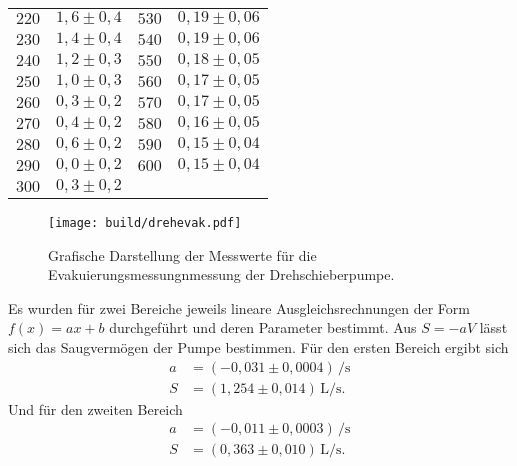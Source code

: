 \begin{table}[H]
\begin{tabular}{c c | c c}
    $220$ & $  1,6 \pm   0,4$  & $530$ & $ 0,19 \pm 0,06 $ \\
    $230$ & $  1,4 \pm   0,4$  & $540$ & $ 0,19 \pm 0,06 $ \\
    $240$ & $  1,2 \pm   0,3$  & $550$ & $ 0,18 \pm 0,05 $ \\
    $250$ & $  1,0 \pm   0,3$  & $560$ & $ 0,17 \pm 0,05 $ \\
    $260$ & $  0,3 \pm  0,2$   & $570$ & $ 0,17 \pm 0,05 $ \\
    $270$ & $  0,4 \pm  0,2$   & $580$ & $ 0,16 \pm 0,05 $ \\
    $280$ & $  0,6 \pm  0,2$   & $590$ & $ 0,15 \pm 0,04 $ \\
    $290$ & $  0,0 \pm  0,2$   & $600$ & $ 0,15 \pm 0,04 $ \\
    $300$ & $  0,3 \pm  0,2$   &       & $ $ \\
    \bottomrule
  \end{tabular}
\end{table}

\begin{figure}[H]
  \centering
  \texttt{[image: build/drehevak.pdf]}
  \caption{Grafische Darstellung der Messwerte für die Evakuierungsmessungnmessung der Drehschieberpumpe.}
  \label{fig:drehevak}
\end{figure}

Es wurden für zwei Bereiche jeweils lineare Ausgleichsrechnungen der Form $f(x)=ax+b$ durchgeführt und deren
Parameter bestimmt. Aus $S=-aV$ lässt sich das Saugvermögen der Pumpe bestimmen. Für den ersten Bereich ergibt
sich
\begin{align*}
  a &= (-0,031 \pm 0,0004)\,\si{\per\second}\\
  S &= (1,254 \pm 0,014)\,\si{\liter\per\second}.
\end{align*}
Und für den zweiten Bereich
\begin{align*}
  a &= (-0,011 \pm 0,0003)\,\si{\per\second}\\
  S &= (0,363 \pm 0,010)\,\si{\liter\per\second}.
\end{align*}